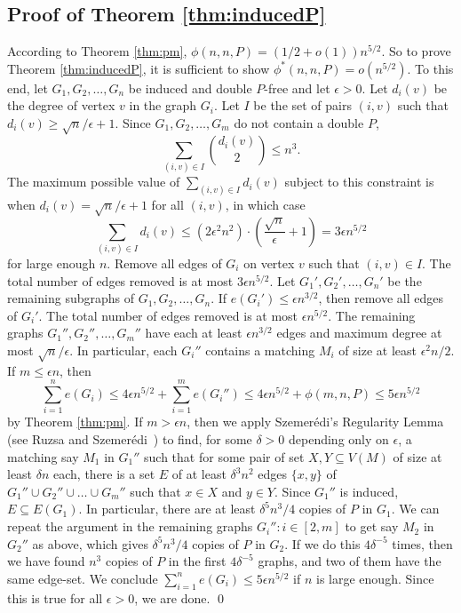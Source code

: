 \documentclass[12pt]{article}
\begin{document}
\subsection{Proof of Theorem \ref{thm:inducedP}}

According to Theorem \ref{thm:pm}, $\phi(n,n,P) = (1/2 + o(1))n^{5/2}$. So to prove Theorem \ref{thm:inducedP}, it is sufficient to show 
$\phi^*(n,n,P) = o(n^{5/2})$. To this end, let $G_1,G_2,\dots,G_n$ be induced and double $P$-free
and let $\epsilon > 0$. Let $d_i(v)$ be the degree of vertex $v$ in the graph $G_i$. 
Let $I$ be the set of pairs $(i,v)$ such that $d_i(v) \geq \sqrt{n}/\epsilon + 1$. Since $G_1,G_2,\dots,G_m$ do not contain a double $P$, 
\[ 
  \sum_{(i,v) \in I} {d_i(v) \choose 2} \leq n^3.
\]
The maximum possible value of $\sum_{(i,v) \in I} d_i(v)$ subject to this constraint is when $d_i(v) = \sqrt{n}/\epsilon + 1$ for all $(i,v)$, in which case 
\[ 
  \sum_{(i,v) \in I} d_i(v) \leq (2\epsilon^2 n^2) \cdot \left(\frac{\sqrt{n}}{\epsilon} + 1\right) = 3\epsilon n^{5/2}
\]
for large enough $n$. Remove all edges of $G_i$ 
on vertex $v$ such that $(i,v) \in I$. The total number of edges removed is at most $3\epsilon n^{5/2}$. Let $G_1',G_2',\dots,G_n'$ be the remaining 
subgraphs of $G_1,G_2,\dots,G_n$. If $e(G_i') \leq \epsilon n^{3/2}$, then remove all edges of $G_i'$. The total number of edges removed is at most $\epsilon n^{5/2}$. The remaining graphs $G_1'',G_2'',\dots,G_m''$ have each at least $\epsilon n^{3/2}$ edges and maximum degree at most $\sqrt{n}/\epsilon$. In particular, each $G_i''$ contains a matching $M_i$ of size at least $\epsilon^2 n/2$. If $m \leq \epsilon n$, 
then 
\[ \sum_{i = 1}^n e(G_i) \leq 4\epsilon n^{5/2} + \sum_{i = 1}^m e(G_i'') \leq 4\epsilon n^{5/2} + \phi(m,n,P) \leq 5\epsilon n^{5/2}\]
by Theorem \ref{thm:pm}. If $m > \epsilon n$, 
then
we apply Szemer\'{e}di's Regularity Lemma (see Ruzsa and Szemer\'{e}di~\cite{RuzsaSzemeredi1978}) to find, for some $\delta > 0$ depending only on $\epsilon$, a matching say $M_1$ in $G_1''$ such that for some pair of set $X, Y \subseteq V(M)$ of size at least $\delta n$ each, there is a set $E$ of at least $\delta^3 n^2$ edges $\{x,y\}$ of $G_1'' \cup G_2'' \cup \dots \cup G_m''$ such that $x \in X$ and $y \in Y$. Since $G_1''$ is induced, $E \subseteq E(G_1)$. In particular, there are at least 
$\delta^5 n^3/4$ copies of $P$ in $G_1$. We can repeat the argument in the remaining graphs $G_i'' : i \in [2,m]$ to get say $M_2$ in $G_2''$ as above, which gives $\delta^5 n^3/4$ copies of $P$ in $G_2$. If we do this $4\delta^{-5}$ times, then we have found $n^3$ copies of $P$ in the first $4\delta^{-5}$ graphs, and two of them have the same edge-set. 
We conclude $\sum_{i = 1}^n e(G_i) \leq 5\epsilon n^{5/2}$ if $n$ is large enough. Since this is true for all $\epsilon > 0$, we are done. \qed
\end{document}
